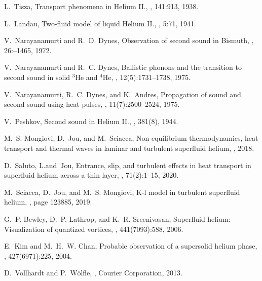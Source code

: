 \documentclass[sn-mathphys]{sn-jnl}%
\theoremstyle{thmstyleone}%
\theoremstyle{thmstyletwo}%
\theoremstyle{thmstylethree}%
\begin{document}
\begin{thebibliography}{9}
	L.~Tisza,
	\newblock Transport phenomena in {H}elium {II}.,
	, 141:913, 1938.
	
	L.~Landau,
	\newblock Two-fluid model of liquid {H}elium {II}.,
	, 5:71, 1941.
	
	V.~Narayanamurti and R.~D. Dynes,
	\newblock Observation of second sound in {B}ismuth,
	, 26:--1465, 1972.
	
	V.~Narayanamurti and R.~C. Dynes,
	\newblock Ballistic phonons and the transition to second sound in solid
	$^{3}${H}e and $^{4}${He},
	, 12(5):1731--1738, 1975.
	
	V.~Narayanamurti, R.~C. Dynes, and K.~Andres,
	\newblock Propagation of sound and second sound using heat pulses,
	, 11(7):2500--2524, 1975.
	
	V.~Peshkov,
	\newblock Second sound in {H}elium {II}.,
	, 381(8), 1944.
	
	M.~S. Mongiovi, D.~Jou, and M.~Sciacca,
	\newblock Non-equilibrium thermodynamics, heat transport and thermal waves in
	laminar and turbulent superfluid helium,
	, 2018.
	
	D.~Saluto, L.and~Jou,
	\newblock Entrance, slip, and turbulent effects in heat transport in superfluid
	helium across a thin layer,
	,
	71(2):1--15, 2020.
	
	M.~Sciacca, D.~Jou, and M.~S. Mongiov{i},
	\newblock K-l model in turbulent superfluid helium,
	, page
	123885, 2019.
	
	G.~P. Bewley, D.~P. Lathrop, and K.~R. Sreenivasan,
	\newblock Superfluid helium: Visualization of quantized vortices,
	, 441(7093):588, 2006.
	
	E.~Kim and M.~H.~W. Chan,
	\newblock Probable observation of a supersolid helium phase,
	, 427(6971):225, 2004.
	
	D.~Vollhardt and P.~W{\"o}lfle,
	,
	\newblock Courier Corporation, 2013.
	

\end{thebibliography}
\end{document}
